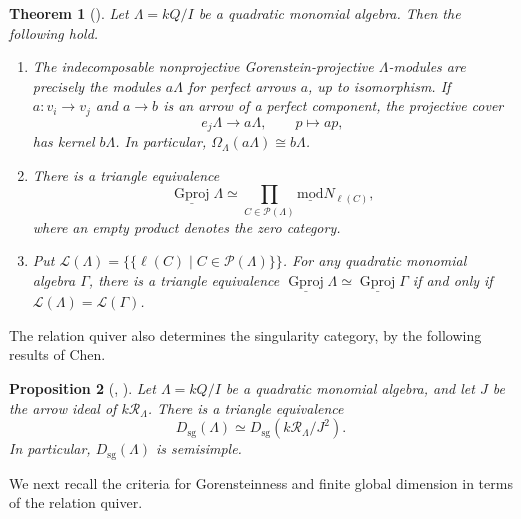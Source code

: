 \documentclass[11pt]{article}
\newcommand{\smod}{\operatorname{\underline{mod}}}
\providecommand{\varLambda}{\Lambda}
\providecommand{\varGamma}{\Gamma}
\newtheorem{theorem}{Theorem}[section]
\newtheorem{proposition}[theorem]{Proposition}
\theoremstyle{definition}
\begin{document}
		\begin{theorem}[{\cite[Proposition~5.1, Lemma~5.3, and Theorem~5.7]{CSZ18}}]
			\label{theorem of Gorenstein projectives and periods}
			Let $\varLambda=kQ/I$ be a quadratic monomial algebra.
			Then the following hold.
			\begin{enumerate}
				\item
				The indecomposable nonprojective Gorenstein-projective $\varLambda$-modules are precisely the modules $a\varLambda$ for perfect arrows $a$, up to isomorphism.
				If $a:v_i\to v_j$ and $a\to b$ is an arrow of a perfect component, the projective cover
				\[
					e_j\varLambda\longrightarrow a\varLambda,
					\qquad p\longmapsto ap,
				\]
				has kernel $b\varLambda$. In particular, $\Omega_{\varLambda}(a\varLambda)\cong b\varLambda$.

				\item
				There is a triangle equivalence
				\[
					\underline{\operatorname{Gproj}}\varLambda
					\simeq
					\prod_{C\in\mathcal P(\varLambda)}\smod N_{\ell(C)},
				\]
				where an empty product denotes the zero category.

				\item
				Put $\mathcal L(\varLambda)
				=\{\!\{\ell(C)\mid C\in\mathcal P(\varLambda)\}\!\}$. For any quadratic monomial algebra $\varGamma$, there is a triangle equivalence
				$\underline{\operatorname{Gproj}}\varLambda
				\simeq
				\underline{\operatorname{Gproj}}\varGamma$ if and only if $\mathcal L(\varLambda)=\mathcal L(\varGamma)$.
			\end{enumerate}
		\end{theorem}

		The relation quiver also determines the singularity category, by the following results of Chen.

		\begin{proposition}[{\cite[Theorem~4.4]{Che18},
				\cite[Theorem~B]{Che11}}]
			\label{proposition of singularity category via relation quiver}
			Let $\varLambda=kQ/I$ be a quadratic monomial algebra, and let $J$ be the arrow ideal of $k\mathcal R_{\varLambda}$. There is a triangle equivalence
			\[
				D_{\mathrm{sg}}(\varLambda)
				\simeq
				D_{\mathrm{sg}}(k\mathcal R_{\varLambda}/J^2).
			\]
			In particular, $D_{\mathrm{sg}}(\varLambda)$ is semisimple.
		\end{proposition}

		We next recall the criteria for Gorensteinness and finite global dimension in terms of the relation quiver.
\end{document}
